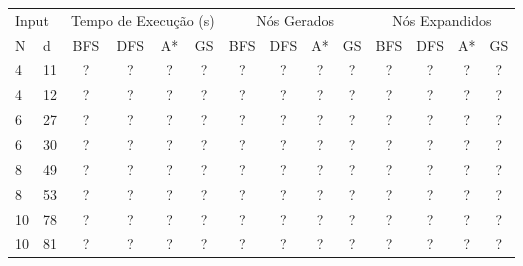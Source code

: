 \documentclass[12pt,a4paper]{article}
\begin{document}
\begin{adjustbox}{width={\textwidth}, totalheight={\textheight}, keepaspectratio}
  \begin{tabular}{ll cccc cccc cccc}
    \toprule
    \multicolumn{2}{l}{Input} & \multicolumn{4}{c}{Tempo de Execução (s)} & \multicolumn{4}{c}{Nós Gerados} & \multicolumn{4}{c}{Nós Expandidos}                                                       \\
    \cmidrule(lr){1-2} \cmidrule(lr){3-6} \cmidrule(lr){7-10} \cmidrule(lr){11-14}
    N                         & d                                         & BFS                             & DFS                                & A* & GS & BFS & DFS & A* & GS & BFS & DFS & A* & GS \\
    \midrule
    4                         & 11                                        & ?                               & ?                                  & ?  & ?  & ?   & ?   & ?  & ?  & ?   & ?   & ?  & ?  \\
    4                         & 12                                        & ?                               & ?                                  & ?  & ?  & ?   & ?   & ?  & ?  & ?   & ?   & ?  & ?  \\
    6                         & 27                                        & ?                               & ?                                  & ?  & ?  & ?   & ?   & ?  & ?  & ?   & ?   & ?  & ?  \\
    6                         & 30                                        & ?                               & ?                                  & ?  & ?  & ?   & ?   & ?  & ?  & ?   & ?   & ?  & ?  \\
    8                         & 49                                        & ?                               & ?                                  & ?  & ?  & ?   & ?   & ?  & ?  & ?   & ?   & ?  & ?  \\
    8                         & 53                                        & ?                               & ?                                  & ?  & ?  & ?   & ?   & ?  & ?  & ?   & ?   & ?  & ?  \\
    10                        & 78                                        & ?                               & ?                                  & ?  & ?  & ?   & ?   & ?  & ?  & ?   & ?   & ?  & ?  \\
    10                        & 81                                        & ?                               & ?                                  & ?  & ?  & ?   & ?   & ?  & ?  & ?   & ?   & ?  & ?  \\

\end{tabular}
\end{adjustbox}
\end{document}
